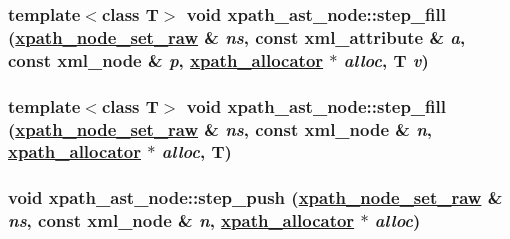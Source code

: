 \hypertarget{classxpath__ast__node_0da76bbadd9b254cf56649392c686c2a}{
\subsubsection[step\_\-fill]{\setlength{\rightskip}{0pt plus 5cm}template$<$class T$>$ void xpath\_\-ast\_\-node::step\_\-fill (\hyperlink{classxpath__node__set__raw}{xpath\_\-node\_\-set\_\-raw} \& {\em ns}, const xml\_\-attribute \& {\em a}, const xml\_\-node \& {\em p}, \hyperlink{classxpath__allocator}{xpath\_\-allocator} $\ast$ {\em alloc}, T {\em v})}}
\label{classxpath__ast__node_0da76bbadd9b254cf56649392c686c2a}


\hypertarget{classxpath__ast__node_2fb0bf78cbdbe0bb032d37f765eab816}{
\subsubsection[step\_\-fill]{\setlength{\rightskip}{0pt plus 5cm}template$<$class T$>$ void xpath\_\-ast\_\-node::step\_\-fill (\hyperlink{classxpath__node__set__raw}{xpath\_\-node\_\-set\_\-raw} \& {\em ns}, const xml\_\-node \& {\em n}, \hyperlink{classxpath__allocator}{xpath\_\-allocator} $\ast$ {\em alloc}, T)}}
\label{classxpath__ast__node_2fb0bf78cbdbe0bb032d37f765eab816}


\hypertarget{classxpath__ast__node_7083f1a6c3d4128bb8a4ac147851a86b}{
\subsubsection[step\_\-push]{\setlength{\rightskip}{0pt plus 5cm}void xpath\_\-ast\_\-node::step\_\-push (\hyperlink{classxpath__node__set__raw}{xpath\_\-node\_\-set\_\-raw} \& {\em ns}, const xml\_\-node \& {\em n}, \hyperlink{classxpath__allocator}{xpath\_\-allocator} $\ast$ {\em alloc})}}
\label{classxpath__ast__node_7083f1a6c3d4128bb8a4ac147851a86b}


